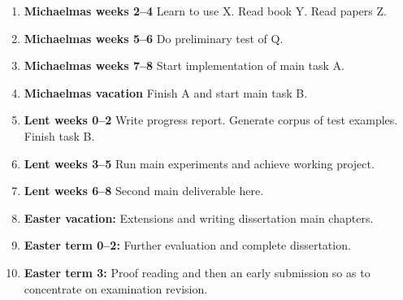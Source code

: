 \documentclass[12pt,a4paper,twoside]{article}
\begin{document}
\begin{enumerate}

\item \textbf{Michaelmas weeks 2--4} Learn to use X. Read book Y. Read papers Z.

\item \textbf{Michaelmas weeks 5--6} Do preliminary test of Q.

\item \textbf{Michaelmas weeks 7--8} Start implementation of main task A.

\item \textbf{Michaelmas vacation} Finish A and start main task B.

\item \textbf{Lent weeks 0--2} Write progress report. Generate corpus of
  test examples. Finish task B.

\item \textbf{Lent weeks 3--5} Run main experiments and achieve working project.

\item \textbf{Lent weeks 6--8} Second main deliverable here.

\item \textbf{Easter vacation:} Extensions and writing dissertation main
  chapters.

\item \textbf{Easter term 0--2:}  Further evaluation and complete dissertation.

\item \textbf{Easter term 3:} Proof reading and then an early submission
  so as to concentrate on examination revision.

\end{enumerate}

\printbibliography
\end{document}
